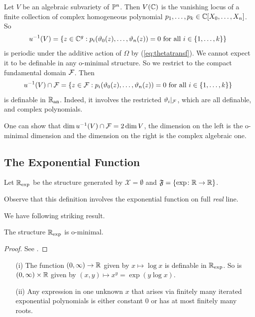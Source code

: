\begin{example}
  Let $V$ be an algebraic subvariety of ${\mathbb{P}}^n$. Then $V({\mathbb{C}})$ is the
  vanishing locus of a finite collection of complex homogeneous
  polynomial $p_1,\ldots,p_k\in {\mathbb{C}}[X_0,\ldots,X_n]$.
  So
  \begin{equation*}
    u^{-1}(V) = \left\{ z \in {\mathbb{C}}^g :
      p_i(\vartheta_0(z),\ldots,\vartheta_n(z))=0 \text{ for all }i\in
      \{1,\ldots,k\} \right\}
  \end{equation*}
  is periodic under the additive action of $\Omega$ by
  (\ref{eq:thetatransf}).
  We cannot expect
  it to be definable in any o-minimal structure. So we restrict to the
  compact fundamental domain ${\mathcal F}$. 
  Then
  \begin{equation*}
    u^{-1}(V) \cap {\mathcal F} = \left\{ z \in {\mathcal F} :
      p_i(\vartheta_0(z),\ldots,\vartheta_n(z))=0 \text{ for all }i\in
      \{1,\ldots,k\} \right\}
  \end{equation*}
  is definable in ${{\mathbb{R}}_{\mathrm{an}}}$. Indeed, it involves the restricted
  $\vartheta_i|_{{\mathcal F}}$, which are all definable, and complex
  polynomials.

  One can show that $\dim u^{-1}(V)\cap {\mathcal F} = 2\dim V$, the dimension
  on the left is the o-minimal dimension and the dimension on the
  right is the complex algebraic one. 
\end{example}

\subsection{The Exponential Function}

\begin{definition}
  Let ${{\mathbb{R}}_{\mathrm{exp}}}$ be the structure generated by $\mathscr{X}=\emptyset$
  and $\mathfrak{F} = \{ \exp \colon {\mathbb{R}}\rightarrow{\mathbb{R}}\}$. 
\end{definition}

Observe that this definition involves the exponential function on full
\emph{real} line.

We have  following striking result.

\begin{theorem}[Wilkie]
  The structure ${{\mathbb{R}}_{\mathrm{exp}}}$ is o-minimal.
\end{theorem}
\begin{proof}
  See \cite{Wilkie:96}. 
\end{proof}

\begin{example}
  \begin{enumerate}
  \item [(i)]
    The function $(0,\infty)\rightarrow{\mathbb{R}}$ given by $x\mapsto \log x$
    is definable in ${{\mathbb{R}}_{\mathrm{exp}}}$.
    So is $(0,\infty)\times{\mathbb{R}}$ given by $(x,y)\mapsto x^y = \exp(y\log x)$.
  \item[(ii)] Any expression in one unknown $x$
    that arises via finitely many iterated
    exponential polynomials is either constant $0$ or has at most
    finitely many roots.
  \end{enumerate}
\end{example}

